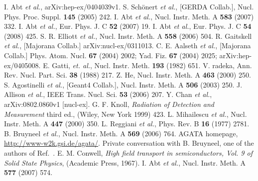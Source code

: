 \documentclass[epj]{svjour}
\begin{document}
\begin{thebibliography}{}
I. Abt \textit{et al.}, arXiv:hep-ex/0404039v1.
S. Sch\"onert \textit{et al.}, [GERDA Collab.],
Nucl. Phys. Proc. Suppl. \textbf{145} (2005) 242.
I. Abt \textit{et al.}, Nucl. Instr. Meth. A
\textbf{583} (2007) 332.
I. Abt \textit{et al.}, Eur. Phys. J. C \textbf{52}
(2007) 19.
I. Abt \textit{et al.}, Eur. Phys. J. C \textbf{54}
(2008) 425.
S. R. Elliott \textit{et al.}, Nucl. Instr. Meth. A
\textbf{558} (2006) 504.
R. Gaitskell \textit{et al.}, [Majorana Collab.]
arXiv:nucl-ex/0311013.
C. E. Aalseth \textit{et al.}, [Majorana Collab.]
Phys. Atom. Nucl. \textbf{67} (2004) 2002; Yad. Fiz. \textbf{67}
(2004) 2025; arXiv:hep-ex/0405008.
E. Gatti, \textit{et. al.},
Nucl. Instr. Meth. \textbf{193} (1982) 651.
V. radeka, Ann. Rev. Nucl. Part. Sci. \textbf{38}
(1988) 217.
Z. He, Nucl. Instr. Meth. A \textbf{463} (2000) 250.
S. Agostinelli \textit{et al.}, [Geant4 Collab.],
Nucl. Instr. Meth. A \textbf{506} (2003) 250.
J. Allison \textit{et al.}, IEEE
Trans. Nucl. Sci. \textbf{53} (2006) 207.
Y. Chan \textit{et al.}, arXiv:0802.0860v1 [nucl-ex].
G. F. Knoll, \textit{Radiation of Detection and
Measurement} third ed., (Wiley, New York 1999) 423.
L. Mihailescu \textit{et al.}, Nucl. Instr. Meth. A
\textbf{447} (2000) 350.
L. Reggiani \textit{et al.}, Phys. Rev. B \textbf{16}
(1977) 2781.
B. Bruyneel \textit{et al.}, Nucl. Instr. Meth. A
\textbf{569} (2006) 764.
AGATA homepage, \url{http://www-w2k.gsi.de/agata/}.
Private conversation with B. Bruyneel, one of the
authors of Ref.~\cite{bart}.
E. M. Conwell, \textit{High field transport in
semiconductors, Vol. 9 of Solid State Physics}, (Academic Press,
1967).
I. Abt \textit{et al.}, Nucl. Instr. Meth. A \textbf{577}
(2007) 574.

\end{thebibliography}
%
\end{document}
